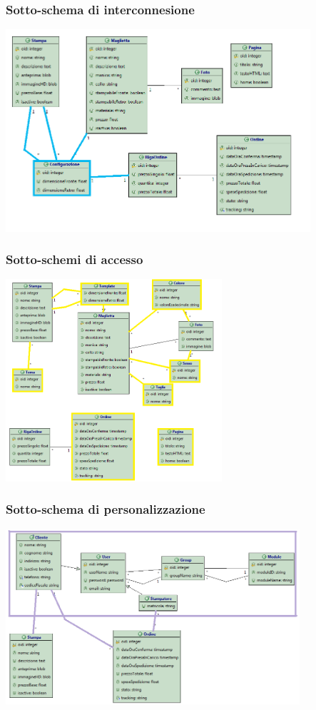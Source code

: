 \documentclass[10pt]{beamer}
\begin{document}
\begin{frame}
	\frametitle{Sotto-schema di interconnesione}
	\begin{center}
		\includegraphics[height=7.5cm]{Immagine/Interconnessione.png}
	\end{center}
\end{frame}

\begin{frame}
	\frametitle{Sotto-schemi di accesso}
	\begin{center}
		\includegraphics[height=7.5cm]{Immagine/Accesso.png}
	\end{center}
\end{frame}

\begin{frame}
	\frametitle{Sotto-schema di personalizzazione}
	\begin{center}
		\includegraphics[height=6.5cm]{Immagine/Personalizzazione.png}
	\end{center}
\end{frame}
\end{document}
